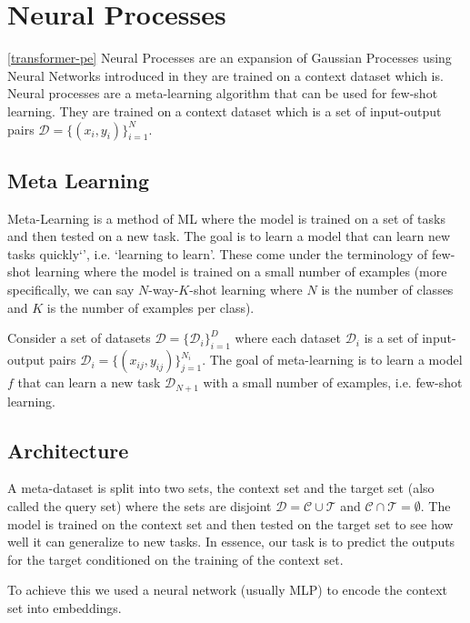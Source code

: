 \documentclass[../../main.tex]{subfiles}
\begin{document}
\section{Neural Processes}

\autoref{transformer-pe}
Neural Processes are an expansion of Gaussian Processes using Neural Networks introduced in \cite{garnelo2018neural} they are trained on a context dataset which is. Neural processes are a meta-learning algorithm that can be used for few-shot learning. They are trained on a context dataset which is a set of input-output pairs $\mathcal{D} = \{ (x_i, y_i) \}_{i=1}^N$. 

\subsection{Meta Learning}

Meta-Learning is a method of ML where the model is trained on a set of tasks and then tested on a new task. The goal is to learn a model that can learn new tasks quickly`', i.e. `learning to learn'. These come under the terminology of few-shot learning where the model is trained on a small number of examples (more specifically, we can say $N$-way-$K$-shot learning where $N$ is the number of classes and $K$ is the number of examples per class).

Consider a set of datasets $\mathcal{D} = \{ \mathcal{D}_i \}_{i=1}^D$ where each dataset $\mathcal{D}_i$ is a set of input-output pairs $\mathcal{D}_i = \{ (x_{ij}, y_{ij}) \}_{j=1}^{N_i}$. The goal of meta-learning is to learn a model $f$ that can learn a new task $\mathcal{D}_{N+1}$ with a small number of examples, i.e. few-shot learning.

\subsection{Architecture}

A meta-dataset is split into two sets, the context set and the target set (also called the query set) where the sets are disjoint $\mathcal{D} = \mathcal{C} \cup \mathcal{T}$ and $\mathcal{C} \cap \mathcal{T} = \emptyset$. The model is trained on the context set and then tested on the target set to see how well it can generalize to new tasks. In essence, our task is to predict the outputs for the target conditioned on the training of the context set.

To achieve this we used a neural network (usually MLP) to encode the context set into embeddings. 
\end{document}
